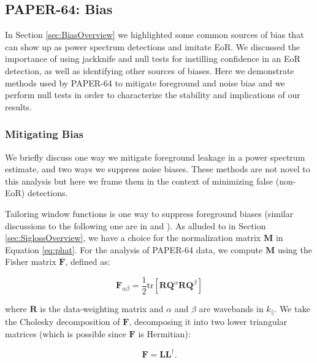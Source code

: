 \documentclass[preprint2,numberedappendix,tighten]{aastex6}  %
\begin{document}

\subsection{PAPER-64: Bias}
\label{sec:Bias}

In Section \ref{sec:BiasOverview} we highlighted some common sources of bias that can show up as power spectrum 
detections and imitate EoR. We discussed the importance of using jackknife and null tests for instilling confidence in an EoR 
detection, as well as identifying other sources of biases. Here we demonstrate methods used by PAPER-64 to mitigate 
foreground and noise bias and we perform null tests in order to characterize the stability and implications of our results.

\subsubsection{Mitigating Bias}

We briefly discuss one way we mitigate foreground leakage in a power spectrum estimate, and two ways we 
suppress noise biases. These methods are not novel to this analysis but here we frame them in the context of minimizing false 
(non-EoR) detections. 

Tailoring window functions is one way to suppress foreground biases (similar discussions to the following one are in \citet{liu_et_al2014b} and ). As alluded to in Section \ref{sec:SiglossOverview}, we 
have a choice for the normalization matrix $\textbf{M}$ in Equation \eqref{eq:phat}. For the analysis of PAPER-64 data, we 
compute $\textbf{M}$ using the Fisher matrix $\textbf{F}$, defined as:

\begin{equation}
\textbf{F}_{\alpha\beta} = \frac{1}{2} \text{tr} [\textbf{R}\textbf{Q}^{\alpha}\textbf{R}\textbf{Q}^{\beta} ]
\end{equation}

\noindent where $\textbf{R}$ is the data-weighting matrix and $\alpha$ and $\beta$ are wavebands in $k_{\parallel}$. We take 
the Cholesky decomposition of $\textbf{F}$, decomposing it into two lower triangular matrices (which is possible since $\textbf{F}$ is Hermitian):

\begin{equation}
\textbf{F} = \textbf{LL}^{\dagger}.
\end{equation}
\end{document}
